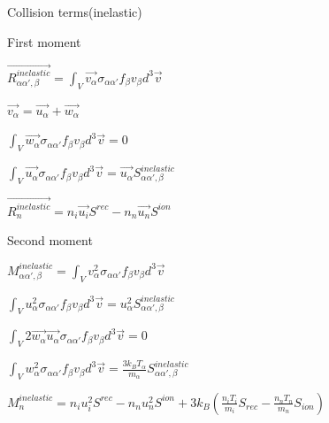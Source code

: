 \documentclass{beamer}
\begin{document}
\begin{frame}{Collision terms(inelastic) }

{\color{red} First moment}

$\vec{R_{\alpha\alpha',\beta}^{inelastic}} = \int_V{\vec{v_\alpha} \sigma_{\alpha \alpha'} f_{\beta} v_{\beta} d^3\vec{v} } $  

$\vec{v_\alpha} = \vec{u_\alpha} + \vec{w_\alpha} $

$\int_V{\vec{w_\alpha} \sigma_{\alpha \alpha'} f_{\beta} v_{\beta} d^3\vec{v} } = 0$

$\int_V{\vec{u_\alpha} \sigma_{\alpha \alpha'} f_{\beta} v_{\beta} d^3\vec{v} } = \vec{u_\alpha} S_{\alpha\alpha',\beta}^{inelastic}$ 
 
$\vec{R_n^{inelastic}} = n_i \vec{u_i} S^{rec} - n_n \vec{u_n} S^{ion}  $ 

{\color{red} Second moment}

$M_{\alpha\alpha',\beta}^{inelastic} = \int_V{v_\alpha^2 \sigma_{\alpha \alpha'} f_{\beta} v_{\beta} d^3\vec{v} }  $

$\int_V{u_\alpha^2 \sigma_{\alpha \alpha'} f_{\beta} v_{\beta} d^3\vec{v} } = u_\alpha^2 S_{\alpha\alpha',\beta}^{inelastic}$

$\int_V{2 \vec{w_\alpha} \vec{u_\alpha} \sigma_{\alpha \alpha'} f_{\beta} v_{\beta} d^3\vec{v} } = 0$
 
$\int_V{w_\alpha^2 \sigma_{\alpha \alpha'} f_{\beta} v_{\beta} d^3\vec{v} } = \frac{3 k_B T_\alpha}{m_\alpha} S_{\alpha\alpha',\beta}^{inelastic} $

$M_n^{inelastic} = n_i u_i^2 S^{rec} - n_n u_n^2 S^{ion} + 3 k_B (\frac{n_i T_i}{m_i} S_{rec} - \frac{n_n T_n}{m_n} S_{ion} ) $ 


\end{frame}
\end{document}
